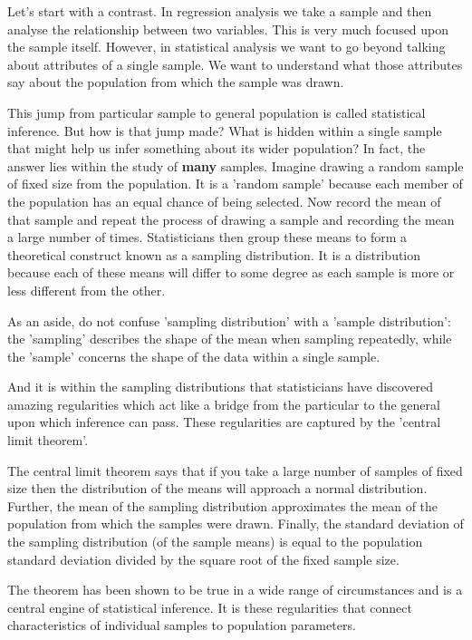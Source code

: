 \documentclass[a4paper,twosided,notoc]{tufte-book}
\begin{document}
Let's start with a contrast. In regression analysis we take a sample and then analyse the relationship between two variables. This is very much focused upon the sample itself. However, in statistical analysis we want to go beyond talking about attributes of a single sample. We want to understand what those attributes say about the population from which the sample was drawn.

This jump from particular sample to general population is called statistical inference. But how is that jump made? What is hidden within a single sample that might help us infer something about its wider population? In fact, the answer lies within the study of \textbf{many} samples. Imagine drawing a random sample of fixed size from the population. It is a 'random sample' because each member of the population has an equal chance of being selected. Now record the mean of that sample and repeat the process of drawing a sample and recording the mean a large number of times. Statisticians then group these means to form a theoretical construct known as a sampling distribution. It is a distribution because each of these means will differ to some degree as each sample is more or less different from the other.

As an aside, do not confuse 'sampling distribution' with a 'sample distribution': the 'sampling' describes the shape of the mean when sampling repeatedly, while the 'sample' concerns the shape of the data within a single sample.

And it is within the sampling distributions that statisticians have discovered amazing regularities which act like a bridge from the particular to the general upon which inference can pass. These regularities are captured by the 'central limit theorem'.

The central limit theorem says that if you take a large number of samples of fixed size then the distribution of the means will approach a normal distribution. Further, the mean of the sampling distribution approximates the mean of the population from which the samples were drawn. Finally, the standard deviation of the sampling distribution (of the sample means) is equal to the population standard deviation divided by the square root of the fixed sample size.

The theorem has been shown to be true in a wide range of circumstances and is a central engine of statistical inference. It is these regularities that connect characteristics of individual samples to population parameters.
\end{document}
